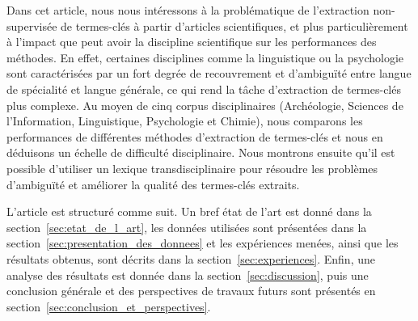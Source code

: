   Dans cet article, nous nous intéressons à la problématique de l'extraction non-supervisée de termes-clés à partir d'articles scientifiques, et plus particulièrement à l'impact que peut avoir la discipline scientifique sur les performances des méthodes.
  En effet, certaines disciplines comme la linguistique ou la psychologie sont caractérisées par un fort degrée de recouvrement et d'ambiguïté entre langue de spécialité et langue générale, ce qui rend la tâche d'extraction de termes-clés plus complexe.
  Au moyen de cinq corpus disciplinaires (Archéologie, Sciences de l'Information, Linguistique, Psychologie et Chimie), nous comparons les performances de différentes méthodes d'extraction de termes-clés et nous en déduisons un échelle de difficulté disciplinaire.
  Nous montrons ensuite qu'il est possible d'utiliser un lexique transdisciplinaire pour résoudre les problèmes d'ambiguïté et améliorer la qualité des termes-clés extraits.


  L'article est structuré comme suit. Un bref état de l'art est donné dans la
  section~\ref{sec:etat_de_l_art}, les données utilisées sont présentées dans la
  section~\ref{sec:presentation_des_donnees} et les expériences menées, ainsi
  que les résultats obtenus, sont décrits dans la section~\ref{sec:experiences}.
  Enfin, une analyse des résultats est donnée dans la
  section~\ref{sec:discussion}, puis une conclusion générale et des perspectives
  de travaux futurs sont présentés en
  section~\ref{sec:conclusion_et_perspectives}.

